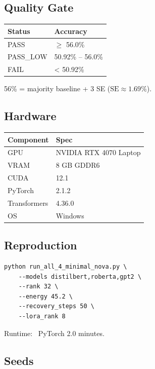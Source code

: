 \subsection{Quality Gate}

\begin{table}[H]
\centering
\small
\begin{tabular}{ll}
\toprule
\textbf{Status} & \textbf{Accuracy} \\
\midrule
PASS & $\ge$ 56.0\% \\
PASS\_LOW & 50.92\% -- 56.0\% \\
FAIL & < 50.92\% \\
\bottomrule
\end{tabular}
\end{table}

56\% = majority baseline + 3 SE ($\text{SE} \approx 1.69\%$).

\subsection{Hardware}

\begin{table}[H]
\centering
\small
\begin{tabular}{ll}
\toprule
\textbf{Component} & \textbf{Spec} \\
\midrule
GPU & NVIDIA RTX 4070 Laptop \\
VRAM & 8 GB GDDR6 \\
CUDA & 12.1 \\
PyTorch & 2.1.2 \\
Transformers & 4.36.0 \\
OS & Windows \\
\bottomrule
\end{tabular}
\end{table}

\subsection{Reproduction}

\begin{lstlisting}
python run_all_4_minimal_nova.py \
    --models distilbert,roberta,gpt2 \
    --rank 32 \
    --energy 45.2 \
    --recovery_steps 50 \
    --lora_rank 8
\end{lstlisting}

Runtime: ~PyTorch 2.0 minutes.

\subsection{Seeds}

